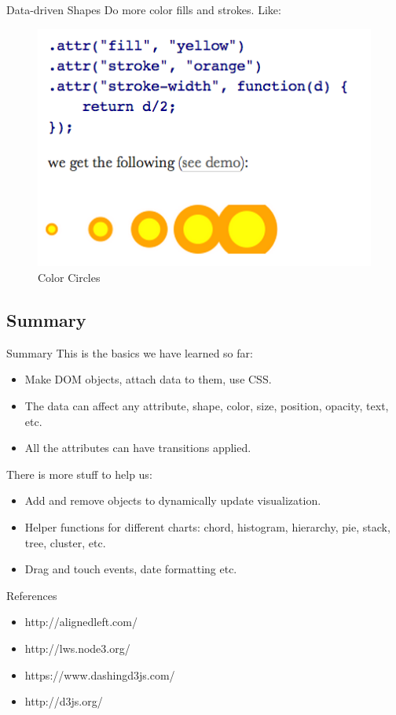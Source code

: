 \documentclass{beamer}
\begin{document}
\begin{frame}{Data-driven Shapes}
Do more color fills and strokes. Like:
\begin{figure}
\includegraphics[width=1.0\textwidth]{./images/color_circles.png}
\caption{\label{fig:colorcircles} Color Circles}
\end{figure}

\end{frame}

\subsection{Summary}

\begin{frame}{Summary} 
This is the basics we have learned so far:
\begin{itemize}
	\item Make DOM objects, attach data to them, use CSS.
	\item The data can affect any attribute, shape, color, size, position, opacity, text, etc.
	\item All the attributes can have transitions applied. 
\end{itemize}
\end{frame}

\begin{frame}
There is more stuff to help us:
\begin{itemize}
	\item Add and remove objects to dynamically update visualization.
	\item Helper functions for different charts: chord, histogram, hierarchy, pie, stack, tree, cluster, etc.
	\item Drag and touch events, date formatting etc.
\end{itemize}
\end{frame}

\begin{frame}{References}
\begin{itemize}
	\item http://alignedleft.com/ 
	\item http://lws.node3.org/
	\item https://www.dashingd3js.com/
	\item http://d3js.org/
\end{itemize}
\end{frame}
\end{document}

